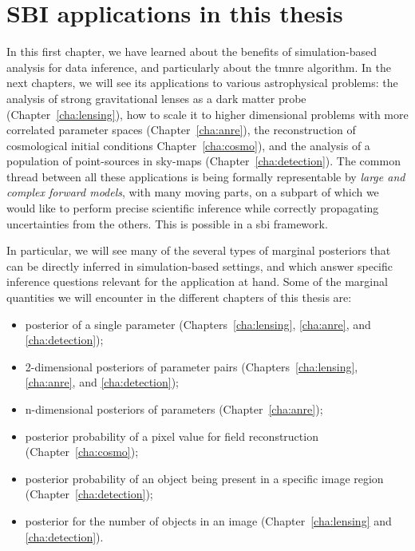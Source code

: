 \section{SBI applications in this thesis} \label{sec:applications}

In this first chapter, we have learned about the benefits of simulation-based analysis for data inference, and particularly about the \gls*{tmnre} algorithm. In the next chapters, we will see its applications to various astrophysical problems: the analysis of strong gravitational lenses as a dark matter probe (Chapter~\ref{cha:lensing}), how to scale it to higher dimensional problems with more correlated parameter spaces (Chapter~\ref{cha:anre}), the reconstruction of cosmological initial conditions Chapter~\ref{cha:cosmo}), and the analysis of a population of point-sources in sky-maps (Chapter~\ref{cha:detection}). The common thread between all these applications is being formally representable by \emph{large and complex forward models}, with many moving parts, on a subpart of which we would like to perform precise scientific inference while correctly propagating uncertainties from the others. This is possible in a \gls*{sbi} framework.

In particular, we will see many of the several types of marginal posteriors that can be directly inferred in simulation-based settings, and which answer specific inference questions relevant for the application at hand. Some of the marginal quantities we will encounter in the different chapters of this thesis are:
\begin{itemize}[leftmargin=1cm]
	\item posterior of a single parameter (Chapters~\ref{cha:lensing}, \ref{cha:anre}, and \ref{cha:detection});
	\item 2-dimensional posteriors of parameter pairs (Chapters~\ref{cha:lensing}, \ref{cha:anre}, and \ref{cha:detection});
	\item n-dimensional posteriors of parameters (Chapter~\ref{cha:anre});
	\item posterior probability of a pixel value for field reconstruction (Chapter~\ref{cha:cosmo});
    \item posterior probability of an object being present in a specific image region (Chapter~\ref{cha:detection});
	\item posterior for the number of objects in an image  (Chapter~\ref{cha:lensing} and \ref{cha:detection}).
\end{itemize}

